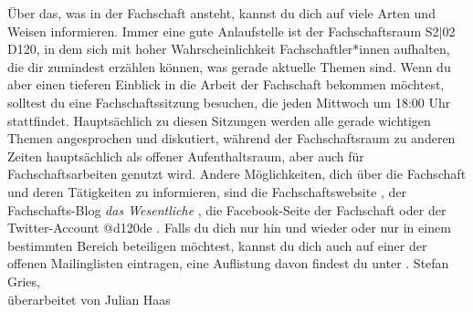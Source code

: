{    Über das, was in der Fachschaft ansteht, kannst du dich auf viele Arten und Weisen informieren. Immer eine gute Anlaufstelle ist der Fachschaftsraum S2$|$02 D120, in dem sich mit hoher Wahrscheinlichkeit Fachschaftler*innen aufhalten, die dir zumindest erzählen können, was gerade aktuelle Themen sind. Wenn du aber einen tieferen Einblick in die Arbeit der Fachschaft bekommen möchtest, solltest du eine Fachschaftssitzung besuchen, die jeden Mittwoch um 18:00 Uhr stattfindet. Hauptsächlich zu diesen Sitzungen werden alle gerade wichtigen Themen angesprochen und diskutiert, während der Fachschaftsraum zu anderen Zeiten hauptsächlich als offener Aufenthaltsraum, aber auch für Fachschaftsarbeiten genutzt wird. Andere Möglichkeiten, dich über die Fachschaft und deren Tätigkeiten zu informieren, sind die Fachschaftswebsite \footnotemark[3], der Fachschafts-Blog \emph{das Wesentliche} \footnotemark[4], die Facebook-Seite der Fachschaft \footnotemark[5] oder der Twitter-Account @d120de \footnotemark[6]. Falls du dich nur hin und wieder oder nur in einem bestimmten Bereich beteiligen möchtest, kannst du dich auch auf einer der offenen Mailinglisten eintragen, eine Auflistung davon findest du unter \footnotemark[7].
}
{Stefan Gries,\\
    überarbeitet von Julian Haas}



\newpage
